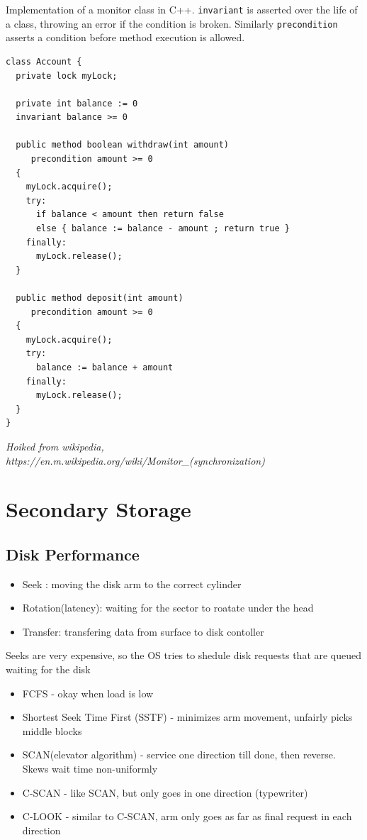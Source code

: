 \documentclass[a4]{article}
\begin{document}
Implementation of a monitor class in C++. \verb|invariant| is asserted over the life of a class, throwing an
error if the condition is broken. Similarly \verb|precondition| asserts a condition before method
execution is allowed. 

\begin{verbatim}
class Account {
  private lock myLock;

  private int balance := 0
  invariant balance >= 0

  public method boolean withdraw(int amount)
     precondition amount >= 0
  {
    myLock.acquire();
    try:
      if balance < amount then return false
      else { balance := balance - amount ; return true }
    finally:
      myLock.release();
  }

  public method deposit(int amount)
     precondition amount >= 0
  {
    myLock.acquire();
    try:
      balance := balance + amount
    finally:
      myLock.release();
  }
}
\end{verbatim}
\emph{Hoiked from wikipedia, https://en.m.wikipedia.org/wiki/Monitor\_(synchronization)}


\section{Secondary Storage}

\subsection{Disk Performance}
\begin{itemize} 
    \item Seek : moving the disk arm to the correct cylinder
    \item Rotation(latency): waiting for the sector to roatate under the head
    \item Transfer: transfering data from surface to disk contoller
\end{itemize}
\vspace{0.5cm}
Seeks are very expensive, so the OS tries to shedule disk requests that are queued waiting for the disk
\begin{itemize}
    \item FCFS - okay when load is low
    \item Shortest Seek Time First (SSTF) - minimizes arm movement, unfairly picks middle blocks
    \item SCAN(elevator algorithm) - service one direction till done, then reverse. Skews wait time non-uniformly
    \item C-SCAN - like SCAN, but only goes in one direction (typewriter)
    \item C-LOOK - similar to C-SCAN, arm only goes as far as final request in each direction
\end{itemize}
\end{document}
